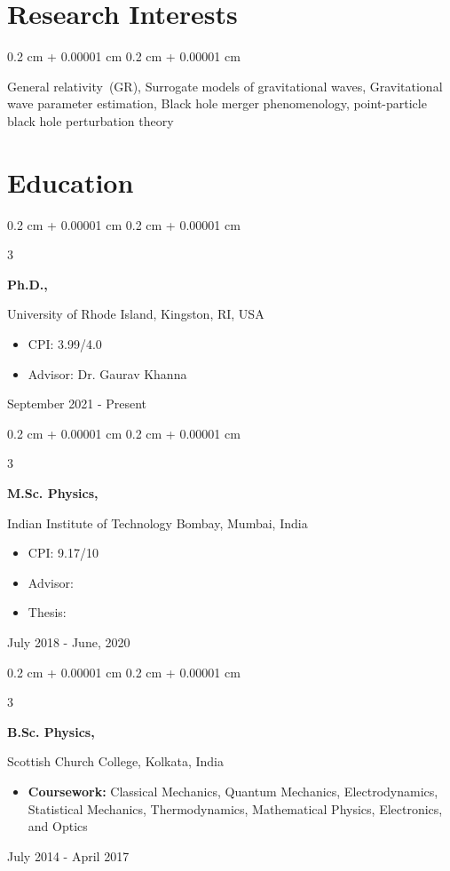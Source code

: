 \documentclass[10pt, letterpaper]{article}
\newenvironment{highlights}{
    \begin{itemize}[
        topsep=0.10 cm,
        parsep=0.10 cm,
        partopsep=0pt,
        itemsep=0pt,
        leftmargin=0.4 cm + 10pt
    ]
}{
    \end{itemize}
}
\newenvironment{onecolentry}{
    \begin{adjustwidth}{
        0.2 cm + 0.00001 cm
    }{
        0.2 cm + 0.00001 cm
    }
}{
    \end{adjustwidth}
}
\newenvironment{threecolentry}[3][]{
    \onecolentry
    \def\thirdColumn{#3}
    \setcolumnwidth{2.5 cm, \fill, 4.5 cm}
    \begin{paracol}{3}
    {\raggedright #2} \switchcolumn
}{
    \switchcolumn \raggedleft \thirdColumn
    \end{paracol}
    \endonecolentry
}
\begin{document}
\vspace{0.3 cm - 0.3 cm}

\section{Research Interests}
  \begin{onecolentry}
    General relativity~(GR), Surrogate models of gravitational waves, Gravitational wave parameter estimation, Black hole merger phenomenology, point-particle black hole perturbation theory
  \end{onecolentry}

\section{Education}
  \begin{threecolentry}{\textbf{Ph.D.,}}{
    September 2021 - Present
  }
    University of Rhode Island, Kingston, RI, USA
  \begin{highlights}
      \item CPI: 3.99/4.0
      \item Advisor: Dr. Gaurav Khanna
  \end{highlights}
\end{threecolentry}

  \begin{threecolentry}{\textbf{M.Sc. Physics,}}{
    July 2018 - June, 2020
  }
    Indian Institute of Technology Bombay, Mumbai, India
  \begin{highlights}
      \item CPI: 9.17/10
      \item Advisor:
      \item Thesis: 
  \end{highlights}
\end{threecolentry} 

  \begin{threecolentry}{\textbf{B.Sc. Physics,}}{
    July 2014 - April 2017
  }
    Scottish Church College, Kolkata, India
    \begin{highlights}
        \item \textbf{Coursework:} Classical Mechanics, Quantum Mechanics, Electrodynamics, Statistical Mechanics, Thermodynamics, Mathematical Physics, Electronics, and Optics
    \end{highlights}
  \end{threecolentry} 
\end{document}
